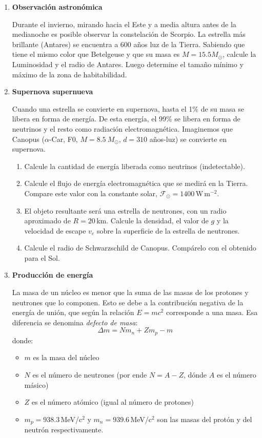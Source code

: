 \documentclass[a4paper,12pt]{article}
\begin{document}
\begin{enumerate}
\item{\bf{Observación astronómica}}

Durante el invierno, mirando hacia el Este y a media altura antes de la
medianoche es posible observar la constelación de Scorpio.  La estrella más
brillante (Antares) se encuentra a 600 años luz de la Tierra.  Sabiendo que
tiene el mismo color que Betelgeuse y que su masa es $M=15.5 M_\odot$, calcule
la Luminosidad y el radio de Antares. Luego determine el tamaño mínimo y máximo
de la zona de habitabilidad.

\item{\bf{Supernova supernueva}}

Cuando una estrella se convierte en supernova, hasta el 1\% de su masa se
libera en forma de energía. De esta energía, el 99\% se libera en forma de
neutrinos y el resto como radiación electromagnética. Imaginemos que Canopus
($\alpha$-Car, F0, $M=8.5\ M_\odot$, $d=310$ años-luz) se convierte en
supernova.
\begin{enumerate}
	\item Calcule la cantidad de energía liberada como neutrinos
		(indetectable).
	\item Calcule el flujo de energía electromagnética que se medirá en la
		Tierra.  Compare este valor con la constante solar,
		$\mathcal{F}_\odot=1400$\,W\,m$^{-2}$.
	\item El objeto resultante será una estrella de neutrones, con un radio
		aproximado de $R=20$\,km. Calcule la densidad, el valor de $g$ y la
		velocidad de escape $v_e$ sobre la superficie de la estrella de
		neutrones.
	\item Calcule el radio de Schwarzschild de Canopus. Compárelo con el
		obtenido para el Sol.
\end{enumerate}

\item{\bf{Producción de energía}}
	
	La masa de un núcleo es menor que la suma de las masas de los protones y
	neutrones que lo componen. Esto se debe a la contribución negativa de la
	energía de unión, que según la relación $E=mc^2$ corresponde a una masa.
	Esa diferencia se denomina {\emph{defecto de masa}}:
	\[ \Delta m = N m_n + Z m_p - m\] donde:
	\begin{itemize}
		\item $m$ es la masa del núcleo
		\item $N$ es el número de neutrones (por ende $N=A-Z$, dónde $A$ es el
			número másico)
		\item $Z$ es el número atómico (igual al número de protones)
		\item $m_p = 938.3$\,MeV/c$^2$ y $m_n = 939.6$\,MeV/c$^2$ son las masas
			del protón y del neutrón respectivamente.
	\end{itemize}
	

\end{enumerate}
\end{document}
